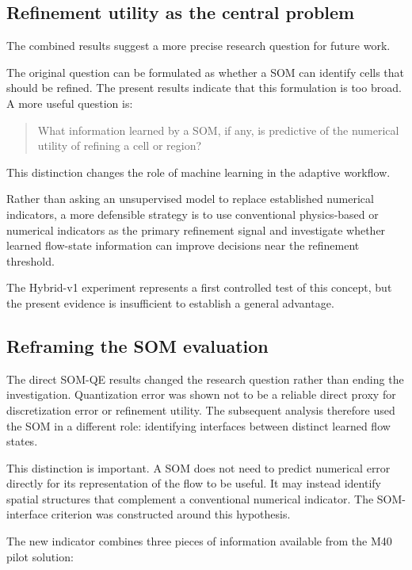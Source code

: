 \subsection{Refinement utility as the central problem}

The combined results suggest a more precise research question for future
work.

The original question can be formulated as whether a SOM can identify cells
that should be refined. The present results indicate that this formulation
is too broad. A more useful question is:

\begin{quote}
What information learned by a SOM, if any, is predictive of the numerical
utility of refining a cell or region?
\end{quote}

This distinction changes the role of machine learning in the adaptive
workflow.

Rather than asking an unsupervised model to replace established numerical
indicators, a more defensible strategy is to use conventional physics-based
or numerical indicators as the primary refinement signal and investigate
whether learned flow-state information can improve decisions near the
refinement threshold.

The Hybrid-v1 experiment represents a first controlled test of this concept,
but the present evidence is insufficient to establish a general advantage.


\subsection{Reframing the SOM evaluation}

The direct SOM-QE results changed the research question rather than ending
the investigation. Quantization error was shown not to be a reliable direct
proxy for discretization error or refinement utility. The subsequent
analysis therefore used the SOM in a different role: identifying interfaces
between distinct learned flow states.

This distinction is important. A SOM does not need to predict numerical
error directly for its representation of the flow to be useful. It may
instead identify spatial structures that complement a conventional
numerical indicator. The SOM-interface criterion was constructed around
this hypothesis.

The new indicator combines three pieces of information available from the
M40 pilot solution:

